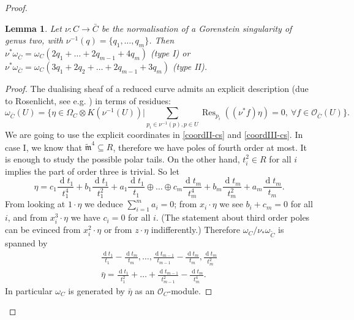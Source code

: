 \documentclass[11pt]{amsart}
\newcommand{\tm}{\widetilde{\mathfrak m}}
\newcommand{\OO}{\mathcal O}
\renewcommand{\to}{\rightarrow}
\theoremstyle{plain}
\newtheorem{lem}[thm]{Lemma}
\theoremstyle{definition}
\begin{document}
\begin{proof}
\begin{lem}\label{lem:dualising_lb}
 Let $\nu\colon C\to \bar C$ be the normalisation of a Gorenstein singularity of genus two, with $\nu^{-1}(q)=\{q_1,\ldots,q_m\}$. Then  $\nu^*\omega_{\bar C}=\omega_C(2q_1+\ldots+2q_{m-1}+4q_m)$ (type I) or $\nu^*\omega_{\bar C}=\omega_C(3q_1+2q_2+\ldots+2q_{m-1}+3q_m)$ (type II).
\end{lem}
\begin{proof}
 The dualising sheaf of a reduced curve admits an explicit description (due to Rosenlicht, see e.g. \cite[Proposition VIII.1.16]{AK}) in terms of residues:
 \[\omega_{\bar C}(U)=\{\eta\in \Omega_{C}\otimes K(\nu^{-1}(U)) | \sum_{p_i\in\nu^{-1}(p),p\in U}\operatorname{Res}_{p_i}((\nu^*f)\eta)=0,\ \forall f\in\OO_{\bar C}(U)\}.\]
 We are going to use the explicit coordinates in \eqref{coordII-cs} and \eqref{coordIII-cs}.
 In case I, we know that $\tm^4\subseteq R$, therefore we have poles of fourth order at most. It is enough to study the possible polar tails. On the other hand, $t_i^2\in R$ for all $i$ implies the part of order three is trivial. So let \[\eta=c_1\frac{\operatorname{d}t_1}{t_1^4}+b_1\frac{\operatorname{d}t_1}{t_1^2}+a_1\frac{\operatorname{d}t_1}{t_1}\oplus\ldots\oplus c_m\frac{\operatorname{d}t_m}{t_m^4}+b_m\frac{\operatorname{d}t_m}{t_m^2}+a_m\frac{\operatorname{d}t_m}{t_m}.\]
 From looking at $1\cdot\eta$ we deduce $\sum_{i=1}^m a_i=0$; from $x_i\cdot\eta$ we see $b_i+c_m=0$ for all $i$, and from $x_i^3\cdot\eta$ we have $c_i=0$ for all $i$. (The statement about third order poles can be evinced from $x_i^2\cdot\eta$ or from $z\cdot\eta$ indifferently.) Therefore $\omega_C/\nu_*\omega_{\tilde C}$ is spanned by
 \begin{align*}
  \frac{\operatorname{d}t_1}{t_1}-\frac{\operatorname{d}t_m}{t_m},\ldots,\frac{\operatorname{d}t_{m-1}}{t_{m-1}}-\frac{\operatorname{d}t_m}{t_m},\frac{\operatorname{d}t_m}{t_m^2}\\
  \bar{\eta}=\frac{\operatorname{d}t_1}{t_1^2}+\ldots+\frac{\operatorname{d}t_{m-1}}{t_{m-1}^2}-\frac{\operatorname{d}t_m}{t_m^4}.
 \end{align*}
In particular $\omega_C$ is generated by $\bar{\eta}$ as an $\OO_C$-module. 


\end{proof}
\end{proof}
\end{document}
